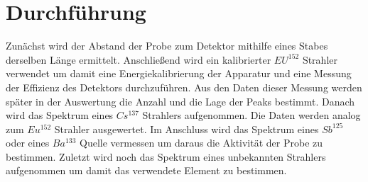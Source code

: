 
\section{Durchführung}
\label{sec:Durchführung}
Zunächst wird der Abstand der Probe zum Detektor mithilfe eines Stabes derselben Länge ermittelt. Anschließend wird ein kalibrierter $EU^{152}$ Strahler verwendet um damit eine Energiekalibrierung der Apparatur und eine Messung der Effizienz des Detektors durchzuführen. Aus den Daten dieser Messung werden später in der Auswertung die Anzahl und die Lage der Peaks bestimmt. Danach wird das Spektrum eines $Cs^{137}$ Strahlers aufgenommen. Die Daten werden analog zum $Eu^{152}$ Strahler ausgewertet. Im Anschluss wird das Spektrum eines $Sb^{125}$ oder eines $Ba^{133}$ Quelle vermessen um daraus die Aktivität der Probe zu bestimmen. Zuletzt wird noch das Spektrum eines unbekannten Strahlers aufgenommen um damit das verwendete Element zu bestimmen.